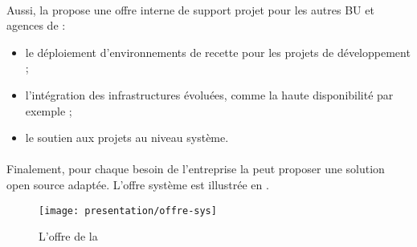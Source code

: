 \paragraph{}
Aussi, la \abusys{} propose une offre interne de support projet pour les autres BU et agences de
\asmile{} :

\begin{itemize}
	\item le déploiement d'environnements de recette pour les projets de développement ;
	\item l'intégration des infrastructures évoluées, comme la haute disponibilité par exemple ;
	\item le soutien aux projets au niveau système.
\end{itemize}

\paragraph{}
Finalement, pour chaque besoin de l'entreprise la \abusys{} peut proposer une solution open source adaptée.
L'offre système est illustrée en .

\begin{figure}
	\centering
	\texttt{[image: presentation/offre-sys]}
	\caption{L'offre de la \abusys}
	\label{figure:presentation:offre-sys}
\end{figure}

